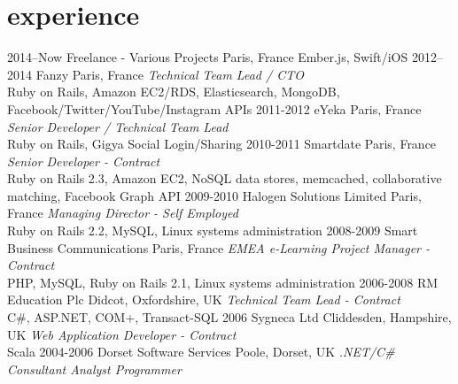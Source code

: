 \documentclass[]{friggeri-cv} %
\begin{document}

\section{experience}

\begin{entrylist}
\entry
{2014--Now}
{Freelance - Various Projects}
{Paris, France}
{Ember.js, Swift/iOS}
\entry
{2012--2014}
{Fanzy}
{Paris, France}
{\emph{Technical Team Lead / CTO} \\
{\color{green}Ruby on Rails, Amazon EC2/RDS, Elasticsearch, MongoDB, Facebook/Twitter/YouTube/Instagram APIs}}
\entry
{2011-2012}
{eYeka}
{Paris, France}
{\emph{Senior Developer / Technical Team Lead} \\
Ruby on Rails, Gigya Social Login/Sharing}
\entry
{2010-2011}
{Smartdate}
{Paris, France}
{\emph{Senior Developer - Contract} \\
Ruby on Rails 2.3, Amazon EC2, NoSQL data stores, memcached, collaborative matching, Facebook Graph API}
\entry
{2009-2010}
{Halogen Solutions Limited}
{Paris, France}
{\emph{Managing Director - Self Employed} \\
Ruby on Rails 2.2, MySQL, Linux systems administration}
\entry
{2008-2009}
{Smart Business Communications}
{Paris, France}
{\emph{EMEA e-Learning Project Manager - Contract} \\
PHP, MySQL, Ruby on Rails 2.1, Linux systems administration}
\entry
{2006-2008}
{RM Education Plc}
{Didcot, Oxfordshire, UK}
{\emph{Technical Team Lead - Contract} \\
C\#, ASP.NET, COM+, Transact-SQL}
\entry
{2006}
{Sygneca Ltd}
{Cliddesden, Hampshire, UK}
{\emph{Web Application Developer - Contract} \\
Scala}
\entry
{2004-2006}
{Dorset Software Services}
{Poole, Dorset, UK}
{\emph{.NET/C\# Consultant Analyst Programmer}}
\end{entrylist}
\end{document}
